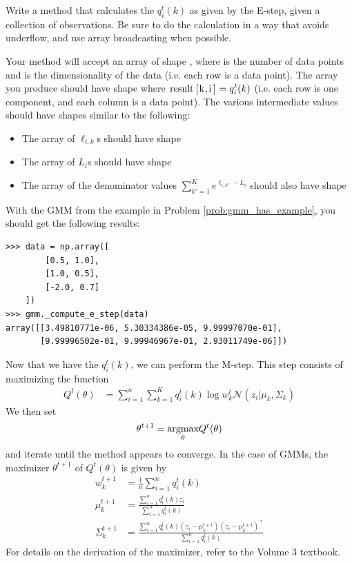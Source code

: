 \begin{problem}
\label{gmm:prob:estep}
Write a method  that calculates the \(q_i^t(k)\) as given by the E-step, given a collection of observations.
Be sure to do the calculation in a way that avoids underflow, and use array broadcasting when possible.

Your method will accept an array of shape , where  is the number of data points and  is the dimensionality of the data (i.e. each row is a data point).
The array you produce should have shape  where \(\text{\li{result[k,i]}} = q_i^t(k)\) (i.e. each row is one component, and each column is a data point).
The various intermediate values should have shapes similar to the following:
\begin{itemize}
\item The array of \(\ell_{i,k}\)s should have shape 
\item The array of \(L_i\)s should have shape 
\item The array of the denominator values \(\sum_{k'=1}^K
e^{\ell_{i,k'}-L_i}\) should also have shape 
\end{itemize}

\noindent
With the GMM from the example in Problem \ref{prob:gmm_has_example}, you should get the following results:
\begin{lstlisting}
>>> data = np.array([
        [0.5, 1.0],
        [1.0, 0.5],
        [-2.0, 0.7]
    ])
>>> gmm._compute_e_step(data)
array([[3.49810771e-06, 5.30334386e-05, 9.99997070e-01],
       [9.99996502e-01, 9.99946967e-01, 2.93011749e-06]])
\end{lstlisting}
\end{problem}

Now that we have the \(q_i^t(k)\), we can perform the M-step.
This step consists of maximizing the function
\begin{align*}
Q^t(\theta)
&=\sum_{i=1}^n
\sum_{k=1}^K
q_i^t(k)\log w_k^t\mathcal{N}(z_i| \mu_k,\Sigma_k)
\end{align*}
We then set 
\[
\theta^{t+1}=\underset{\theta}{\mbox{argmax}} Q^t(\theta)
\]
and iterate until the method appears to converge.
In the case of GMMs, the maximizer \(\theta^{t+1}\) of \(Q^t(\theta)\) is given by
\begin{align*}
w_k^{t+1}&=\frac{1}{n}\sum_{i=1}^n q_i^t(k) \\
\mu_k^{t+1}
&=
\frac{\sum_{i=1}^n q_i^t(k) z_i}{\sum_{i=1}^n q_i^t(k)}
\\
\Sigma_k^{t+1}
&=
\frac{\sum_{i=1}^n q_i^t(k) (z_i-\mu_k^{t+1})(z_i-\mu_k^{t+1})^\top}{\sum_{i=1}^n q_i^t(k)}
\end{align*}
For details on the derivation of the maximizer, refer to the Volume 3 textbook.

